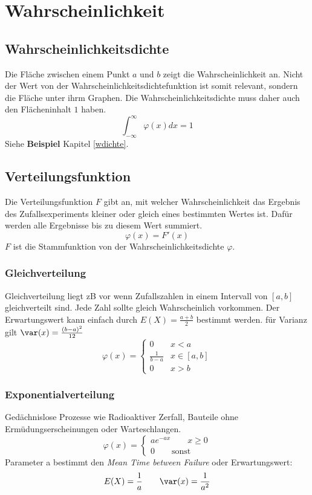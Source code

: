 \section{Wahrscheinlichkeit}
\subsection{Wahrscheinlichkeitsdichte}
Die Fläche zwischen einem Punkt $a$ und $b$ zeigt die Wahrscheinlichkeit an. Nicht der Wert von der Wahrscheinlichkeitsdichtefunktion ist somit relevant, sondern die Fläche unter ihrm Graphen. Die Wahrscheinlichkeitsdichte muss daher auch den Flächeninhalt $1$ haben. 
\[
\int_{-\infty}^{\infty}\varphi(x)dx = 1
\]
Siehe \textbf{Beispiel} Kapitel \ref{wdichte}.

\subsection{Verteilungsfunktion}
Die Verteilungsfunktion $F$ gibt an, mit welcher Wahrscheinlichkeit das Ergebnis des Zufallsexperiments kleiner oder gleich eines bestimmten Wertes ist. Dafür werden alle Ergebnisse bis zu diesem Wert summiert. 
\[
\varphi(x) = F'(x)
\]
$F$ ist die Stammfunktion von der Wahrscheinlichkeitsdichte $\varphi$.

\subsubsection{Gleichverteilung}
Gleichverteilung liegt zB vor wenn Zufallszahlen  in einem Intervall von $[a, b]$ gleichverteilt sind. Jede Zahl sollte gleich Wahrscheinlich vorkommen. Der Erwartungswert kann einfach durch $E(X) = \frac{a + b}{2}$ bestimmt werden. für Varianz gilt $\var(x) = \frac{(b-a)^2}{12}$
\[
\varphi(x) = \begin{cases}
	0 & x < a \\
	\frac{1}{b-a} & x \in [a,b] \\
	0 & x > b
\end{cases}
\]

\subsubsection{Exponentialverteilung}
Gedächnislose Prozesse wie Radioaktiver Zerfall, Bauteile ohne Ermüdungserscheinungen oder Warteschlangen.
\[\varphi(x) = \begin{cases*}
	ae^{-ax} \qquad x \geq 0 \\
	0 \qquad \text{sonst}
\end{cases*}\]
Parameter a bestimmt den \textit{Mean Time between Failure} oder Erwartungswert: 
\[E(X) = \frac{1}{a} \qquad \var(x) = \frac{1}{a^2}\]

